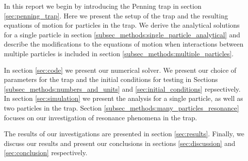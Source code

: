 In this report we begin by introducing the Penning trap in section \ref{sec:penning_trap}. Here we present the setup of the trap and the resulting equations of motion for particles in the trap. We derive the analytical solutions for a single particle in section \ref{subsec_methods:single_particle_analytical} and describe the modifications to the equations of motion when interactions between multiple particles is included in section \ref{subsec_methods:multiple_particles}.    

In section \ref{sec:code} we present our numerical solver. We present our choice of parameters for the trap and the initial conditions for testing in Sections \ref{subsec_methods:numbers_and_units} and \ref{sec:initial_conditions} repsectively. In section \ref{sec:simulation} we present the analysis for a single particle, as well as two particles in the trap. Section \ref{subsec_methods:many_particles_resonance} focuses on our investigation of resonance phenomena in the trap.  

The results of our investigations are presented in section \ref{sec:results}. Finally, we discuss our results and present our conclusions in sections \ref{sec:discussion} and \ref{sec:conclusion} respectively.   


